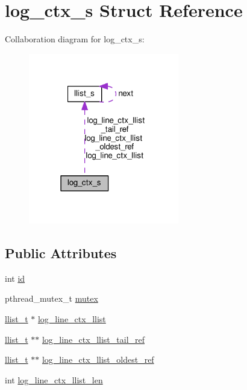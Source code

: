 \hypertarget{structlog__ctx__s}{}\section{log\+\_\+ctx\+\_\+s Struct Reference}
\label{structlog__ctx__s}


Collaboration diagram for log\+\_\+ctx\+\_\+s\+:\nopagebreak
\begin{figure}[H]
\begin{center}
\leavevmode
\includegraphics[width=186pt]{structlog__ctx__s__coll__graph}
\end{center}
\end{figure}
\subsection*{Public Attributes}
\begin{DoxyCompactItemize}
\item 
int \hyperlink{structlog__ctx__s_a56a669a98c9bf4cf34f233ce1343f956}{id}
\item 
pthread\+\_\+mutex\+\_\+t \hyperlink{structlog__ctx__s_a4b1f68253562a2a0bb7f40f8d9f51aee}{mutex}
\item 
\hyperlink{llist_8h_a90862badf6f9cc4e3d6348b7d60ce4f0}{llist\+\_\+t} $\ast$ \hyperlink{structlog__ctx__s_a388b23d6920493eb0370fde713dd3cd4}{log\+\_\+line\+\_\+ctx\+\_\+llist}
\item 
\hyperlink{llist_8h_a90862badf6f9cc4e3d6348b7d60ce4f0}{llist\+\_\+t} $\ast$$\ast$ \hyperlink{structlog__ctx__s_aeb3572f72559503e327e99525d28ca85}{log\+\_\+line\+\_\+ctx\+\_\+llist\+\_\+tail\+\_\+ref}
\item 
\hyperlink{llist_8h_a90862badf6f9cc4e3d6348b7d60ce4f0}{llist\+\_\+t} $\ast$$\ast$ \hyperlink{structlog__ctx__s_a8f6f89d568b21e624a2e30f023c96e2c}{log\+\_\+line\+\_\+ctx\+\_\+llist\+\_\+oldest\+\_\+ref}
\item 
int \hyperlink{structlog__ctx__s_a03f1fa736dac6969657399b55a1d1838}{log\+\_\+line\+\_\+ctx\+\_\+llist\+\_\+len}
\end{DoxyCompactItemize}


